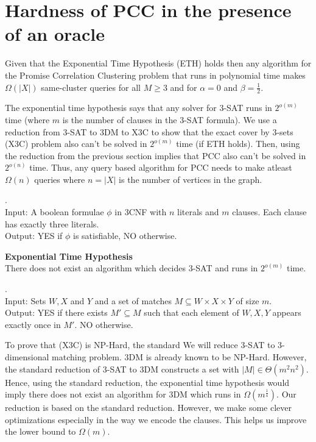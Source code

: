 \section{Hardness of PCC in the presence of an oracle}
\begin{theorem}
Given that the Exponential Time Hypothesis (ETH) holds then any algorithm for the Promise Correlation Clustering problem  that runs in polynomial time makes $\Omega(|X|)$ same-cluster queries for all $M \ge 3$ and for $\alpha = 0$ and $\beta = \frac{1}{2}$. 
\end{theorem}

\noindent The exponential time hypothesis says that any solver for $3$-SAT runs in $2^{o(m)}$ time (where $m$ is the number of clauses in the $3$-SAT formula). We use a reduction from $3$-SAT to 3DM to X3C to show that the exact cover by 3-sets (X3C) problem also can't be solved in $2^{o(m)}$ time (if ETH holds). Then, using the reduction from the previous section implies that PCC also can't be solved in $2^{o(n)}$ time. Thus, any query based algorithm for PCC needs to make atleast $\Omega(n)$ queries where $n = |X|$ is the number of vertices in the graph. 

\begin{definition}[3-SAT].\\
Input: A boolean formulae $\phi$ in 3CNF with $n$ literals and $m$ clauses. Each clause has exactly three literals. \\
Output: YES if $\phi$ is satisfiable, NO otherwise. 
\end{definition}

\noindent\textbf{Exponential Time Hypothesis}\\
There does not exist an algorithm which decides 3-SAT  and runs in $2^{o(m)}$ time.

\begin{definition}[3DM].\\
Input: Sets $W, X$ and $Y$ and a set of matches $M \subseteq W \times X \times Y$ of size $m$.  \\
Output: YES if there exists $M' \subseteq M$ such that each element of $W, X, Y$ appears exactly once in $M'$. NO otherwise. 
\end{definition}

\noindent To prove that (X3C) is NP-Hard, the standard We will reduce 3-SAT to 3-dimensional matching problem. 3DM is already known to be NP-Hard. However, the standard reduction of 3-SAT to 3DM constructs a set with $|M| \in \Theta(m^2 n^2)$. Hence, using the standard reduction, the exponential time hypothesis would imply there does not exist an algorithm for 3DM which runs in $\Omega(m^\frac{1}{4})$. Our reduction is based on the standard reduction. However, we make some clever optimizations especially in the way we encode the clauses. This helps us improve the lower bound to $\Omega(m)$.

